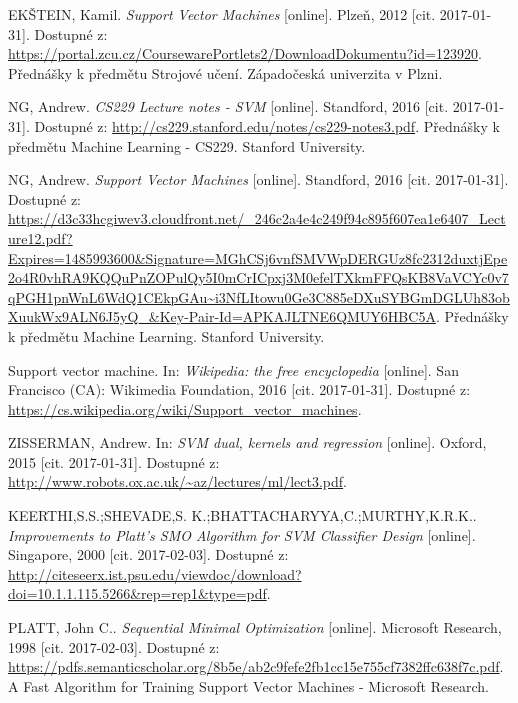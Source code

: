 \documentclass[a4]{article}
\begin{document}
\appendix
\begin{thebibliography}{99}

EKŠTEIN, Kamil. \textit{Support Vector Machines} [online]. Plzeň, 2012 [cit. 2017-01-31]. Dostupné z: \url{https://portal.zcu.cz/CoursewarePortlets2/DownloadDokumentu?id=123920}. Přednášky k předmětu Strojové učení. Západočeská univerzita v Plzni.

NG, Andrew. \textit{CS229 Lecture notes - SVM} [online]. Standford, 2016 [cit. 2017-01-31]. Dostupné z: \url{http://cs229.stanford.edu/notes/cs229-notes3.pdf}. Přednášky k předmětu Machine Learning - CS229. Stanford University.

NG, Andrew. \textit{Support Vector Machines} [online]. Standford, 2016 [cit. 2017-01-31]. Dostupné z: \url{https://d3c33hcgiwev3.cloudfront.net/_246c2a4e4c249f94c895f607ea1e6407_Lecture12.pdf?Expires=1485993600&Signature=MGhCSj6vnfSMVWpDERGUz8fc2312duxtjEpe2o4R0vhRA9KQQuPnZOPulQy5I0mCrICpxj3M0efelTXkmFFQsKB8VaVCYc0v7qPGH1pnWnL6WdQ1CEkpGAu~i3NfLItowu0Ge3C885eDXuSYBGmDGLUh83obXuukWx9ALN6J5yQ_&Key-Pair-Id=APKAJLTNE6QMUY6HBC5A}. Přednášky k předmětu Machine Learning. Stanford University.

Support vector machine. In: \textit{Wikipedia: the free encyclopedia} [online]. San Francisco (CA): Wikimedia Foundation, 2016 [cit. 2017-01-31]. Dostupné z: \url{https://cs.wikipedia.org/wiki/Support_vector_machines}.

ZISSERMAN, Andrew. In: \textit{SVM dual, kernels and regression} [online]. Oxford, 2015 [cit. 2017-01-31]. Dostupné z: \url{http://www.robots.ox.ac.uk/~az/lectures/ml/lect3.pdf}.

KEERTHI,S.S.;SHEVADE,S. K.;BHATTACHARYYA,C.;MURTHY,K.R.K.. \textit{Improvements to Platt’s SMO Algorithm for SVM Classifier
Design} [online]. Singapore, 2000 [cit. 2017-02-03]. Dostupné z: \url{http://citeseerx.ist.psu.edu/viewdoc/download?doi=10.1.1.115.5266&rep=rep1&type=pdf}.

PLATT, John C.. \textit{Sequential Minimal Optimization} [online]. Microsoft Research, 1998 [cit. 2017-02-03]. Dostupné z: \url{https://pdfs.semanticscholar.org/8b5e/ab2c9fefe2fb1cc15e755cf7382ffc638f7c.pdf}. A Fast Algorithm for Training Support Vector Machines - Microsoft Research.

\end{thebibliography}
\end{document}
